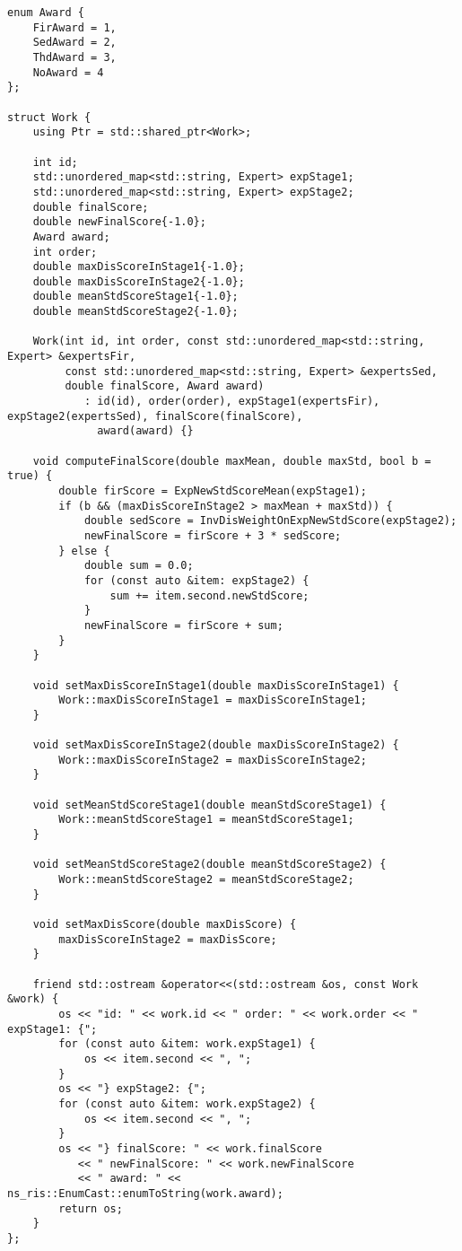 \documentclass[bwprint]{gmcmthesis}
\begin{document}
\begin{lstlisting}[label=work_class,caption={作品类的数据结构定义}]
enum Award {
    FirAward = 1,
    SedAward = 2,
    ThdAward = 3,
    NoAward = 4
};

struct Work {
    using Ptr = std::shared_ptr<Work>;

    int id;
    std::unordered_map<std::string, Expert> expStage1;
    std::unordered_map<std::string, Expert> expStage2;
    double finalScore;
    double newFinalScore{-1.0};
    Award award;
    int order;
    double maxDisScoreInStage1{-1.0};
    double maxDisScoreInStage2{-1.0};
    double meanStdScoreStage1{-1.0};
    double meanStdScoreStage2{-1.0};

    Work(int id, int order, const std::unordered_map<std::string, Expert> &expertsFir,
         const std::unordered_map<std::string, Expert> &expertsSed,
         double finalScore, Award award)
            : id(id), order(order), expStage1(expertsFir), expStage2(expertsSed), finalScore(finalScore),
              award(award) {}

    void computeFinalScore(double maxMean, double maxStd, bool b = true) {
        double firScore = ExpNewStdScoreMean(expStage1);
        if (b && (maxDisScoreInStage2 > maxMean + maxStd)) {
            double sedScore = InvDisWeightOnExpNewStdScore(expStage2);
            newFinalScore = firScore + 3 * sedScore;
        } else {
            double sum = 0.0;
            for (const auto &item: expStage2) {
                sum += item.second.newStdScore;
            }
            newFinalScore = firScore + sum;
        }
    }

    void setMaxDisScoreInStage1(double maxDisScoreInStage1) {
        Work::maxDisScoreInStage1 = maxDisScoreInStage1;
    }

    void setMaxDisScoreInStage2(double maxDisScoreInStage2) {
        Work::maxDisScoreInStage2 = maxDisScoreInStage2;
    }

    void setMeanStdScoreStage1(double meanStdScoreStage1) {
        Work::meanStdScoreStage1 = meanStdScoreStage1;
    }

    void setMeanStdScoreStage2(double meanStdScoreStage2) {
        Work::meanStdScoreStage2 = meanStdScoreStage2;
    }

    void setMaxDisScore(double maxDisScore) {
        maxDisScoreInStage2 = maxDisScore;
    }

    friend std::ostream &operator<<(std::ostream &os, const Work &work) {
        os << "id: " << work.id << " order: " << work.order << " expStage1: {";
        for (const auto &item: work.expStage1) {
            os << item.second << ", ";
        }
        os << "} expStage2: {";
        for (const auto &item: work.expStage2) {
            os << item.second << ", ";
        }
        os << "} finalScore: " << work.finalScore
           << " newFinalScore: " << work.newFinalScore
           << " award: " << ns_ris::EnumCast::enumToString(work.award);
        return os;
    }
};

\end{lstlisting}
\end{document}
